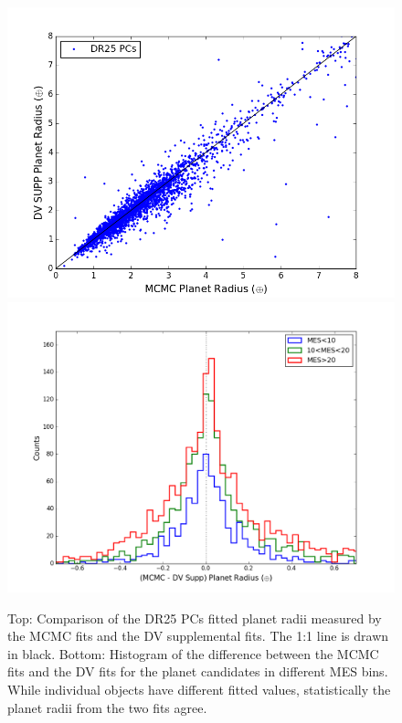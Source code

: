 \begin{figure}
\centering
\includegraphics[width=0.99\linewidth]{fig-comparePradius-mcmcSup.png}
\includegraphics[width=0.99\linewidth]{fig-comparePradius-histogram.png}
\caption{Top: Comparison of the DR25 PCs fitted planet radii measured by the MCMC fits and the DV supplemental fits. The 1:1 line is drawn in black. Bottom: Histogram of the difference between the MCMC fits and the DV fits for the planet candidates in different MES bins. While individual objects have different fitted values, statistically the planet radii from the two fits agree. }
\label{f:mcmcsupp}
\end{figure}


